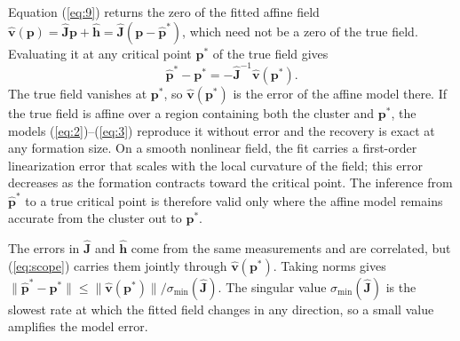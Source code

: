 \documentclass[lettersize,journal]{IEEEtran}
\begin{document}
Equation (\ref{eq:9}) returns the zero of the fitted affine field $\hat{\mathbf{v}}(\mathbf{p}) = \hat{\mathbf{J}}\mathbf{p} + \hat{\mathbf{h}} = \hat{\mathbf{J}}(\mathbf{p} - \hat{\mathbf{p}}^*)$, which need not be a zero of the true field. Evaluating it at any critical point $\mathbf{p}^*$ of the true field gives
\begin{equation}\label{eq:scope}
\hat{\mathbf{p}}^* - \mathbf{p}^* = -\hat{\mathbf{J}}^{-1}\hat{\mathbf{v}}(\mathbf{p}^*).
\end{equation}
The true field vanishes at $\mathbf{p}^*$, so $\hat{\mathbf{v}}(\mathbf{p}^*)$ is the error of the affine model there. If the true field is affine over a region containing both the cluster and $\mathbf{p}^*$, the models (\ref{eq:2})--(\ref{eq:3}) reproduce it without error and the recovery is exact at any formation size. On a smooth nonlinear field, the fit carries a first-order linearization error that scales with the local curvature of the field; this error decreases as the formation contracts toward the critical point. The inference from $\hat{\mathbf{p}}^*$ to a true critical point is therefore valid only where the affine model remains accurate from the cluster out to $\mathbf{p}^*$.

The errors in $\hat{\mathbf{J}}$ and $\hat{\mathbf{h}}$ come from the same measurements and are correlated, but (\ref{eq:scope}) carries them jointly through $\hat{\mathbf{v}}(\mathbf{p}^*)$. Taking norms gives $\|\hat{\mathbf{p}}^* - \mathbf{p}^*\| \le \|\hat{\mathbf{v}}(\mathbf{p}^*)\|/\sigma_{\min}(\hat{\mathbf{J}})$. The singular value $\sigma_{\min}(\hat{\mathbf{J}})$ is the slowest rate at which the fitted field changes in any direction, so a small value amplifies the model error.
\end{document}
